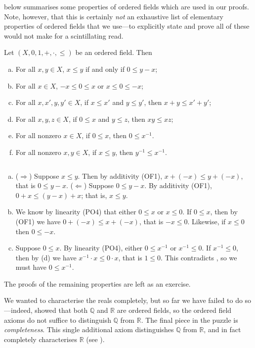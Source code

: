  below summarises some properties of ordered fields which are used in our proofs. Note, however, that this is certainly \textit{not} an exhaustive list of elementary properties of ordered fields that we use---to explicitly state and prove all of these would not make for a scintillating read.

\begin{theorem}
\label{thmPropertiesOfOrderedFields}
Let $(X,0,1,+,{\cdot},{\le})$ be an ordered field. Then
\begin{enumerate}[(a)]
\item For all $x,y \in X$, $x \le y$ if and only if $0 \le y-x$;
\item For all $x \in X$, $-x \le 0 \le x$ or $x \le 0 \le -x$;
\item For all $x,x',y,y' \in X$, if $x \le x'$ and $y \le y'$, then $x + y \le x' + y'$;
\item For all $x,y,z \in X$, if $0 \le x$ and $y \le z$, then $xy \le xz$;
\item For all nonzero $x \in X$, if $0 \le x$, then $0 \le x^{-1}$.
\item For all nonzero $x,y \in X$, if $x \le y$, then $y^{-1} \le x^{-1}$.
\end{enumerate}
\end{theorem}
\begin{cproof}[of {(a)}, {(b)} and {(e)}]
$ $
\begin{enumerate}[(a)] 
\item ($\Rightarrow$) Suppose $x \le y$. Then by additivity (OF1), $x+(-x) \le y+(-x)$, that is $0 \le y-x$. ($\Leftarrow$) Suppose $0 \le y-x$. By additivity (OF1), $0+x \le (y-x)+x$; that is, $x \le y$.
\item We know by linearity (PO4) that either $0 \le x$ or $x \le 0$. If $0 \le x$, then by (OF1) we have $0+(-x) \le x+(-x)$, that is $-x \le 0$. Likewise, if $x \le 0$ then $0 \le -x$.
\setcounter{enumi}{4}
\item Suppose $0 \le x$. By linearity (PO4), either $0 \le x^{-1}$ or $x^{-1} \le 0$. If $x^{-1} \le 0$, then by (d) we have $x^{-1} \cdot x \le 0 \cdot x$, that is $1 \le 0$. This contradicts , so we must have $0 \le x^{-1}$.
\end{enumerate}
The proofs of the remaining properties are left as an exercise.
\end{cproof}

We wanted to characterise the reals completely, but so far we have failed to do so---indeed,  showed that both $\mathbb{Q}$ and $\mathbb{R}$ are ordered fields, so the ordered field axioms do not suffice to distinguish $\mathbb{Q}$ from $\mathbb{R}$. The final piece in the puzzle is \textit{completeness}. This single additional axiom distinguishes $\mathbb{Q}$ from $\mathbb{R}$, and in fact completely characterises $\mathbb{R}$ (see ).

